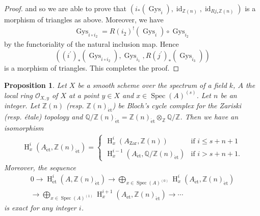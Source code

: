 \documentclass{article}
\newtheorem{prop}[thm]{\indent \sc Proposition}
\newcommand{\spec}{\operatorname{Spec}}
\newcommand{\et}{\mathrm{\acute{e}t}}
\newcommand{\Zar}{\mathrm{Zar}}
\newcommand{\HO}{\operatorname{H}}
\begin{document}
\begin{proof}
%
and so we are able to prove that
%
\begin{math}
\left( 
i_{*}(\operatorname{Gys}_{i}),
\operatorname{id}_{\mathbb{Z}(n)},
\operatorname{id}_{Rj_{*}\mathbb{Z}(n)}
\right)
\end{math}
%
is a morphism of triangles as above.
Moreover, we have
%
\begin{align*}
\operatorname{Gys}_{i\circ i_{2}} 
=
R(i_{2})^{!}(\operatorname{Gys}_{i})
\circ 
\operatorname{Gys}_{i_{2}}
\end{align*}
%
by the functoriality of the natural 
inclusion map.
Hence 
%
\begin{equation*}
\left( 
(i^{\prime})_{*}(\operatorname{Gys}_{i\circ i_{2}}),
\operatorname{Gys}_{i_{1}},
R(j^{\prime})_{*}(\operatorname{Gys}_{i_{3}})
\right)
\end{equation*}
%
is a morphism of triangles. This completes the proof.
\end{proof}
%


%
\begin{prop}\upshape\label{EtmotGer}
Let $X$ be a smooth scheme over the spectrum of a field $k$,
$A$ the local ring 
$\mathcal{O}_{X, y}$ of $X$ at a point $y\in X$
and $x\in \spec(A)^{(s)}$. 
Let $n$ be an integer.
Let $\mathbb{Z}(n)$
(resp. $\mathbb{Z}(n)_{\et}$)
be
Bloch's cycle complex for
the Zariski (resp. \'{e}tale) topology
and 
$\mathbb{Q}/\mathbb{Z}(n)_{\et}=\mathbb{Z}(n)_{\et}\otimes_{\mathbb{Z}}\mathbb{Q}/\mathbb{Z}$.
Then we have an isomorphism
%
\begin{align}\label{SupZ}
\HO^{i}_{x}(
A_{\et},
\mathbb{Z}(n)_{\et}
)
=
\left\{
%
\begin{array}{ll}
\HO^{i}_{x}(A_{\Zar},
\mathbb{Z}(n))
&  \textrm{if $i\leq s+n+1$}  \\ [5pt]
\HO^{i-1}_{x}(
A_{\et},
\mathbb{Q}/\mathbb{Z}(n)_{\et}
)  
&  \textrm{if $i> s+n+1$}.
\end{array}
%
\right.
\end{align}
% 
Moreover, the sequence
%
\begin{align*}
0
\to 
\HO^{i}_{\et}(
A, \mathbb{Z}(n)_{\et}
)
\to 
\displaystyle\bigoplus_{x\in \spec(A)^{(0)}}
\HO^{i}_{x}(
A_{\et},
\mathbb{Z}(n)_{\et}
)
\\
\to
\displaystyle\bigoplus_{x\in \spec(A)^{(1)}}
\HO^{i+1}_{x}(
A_{\et},
\mathbb{Z}(n)_{\et}
)
\to
\cdots
\end{align*}
%
is exact for any integer $i$.
\end{prop}
%
\end{document}
